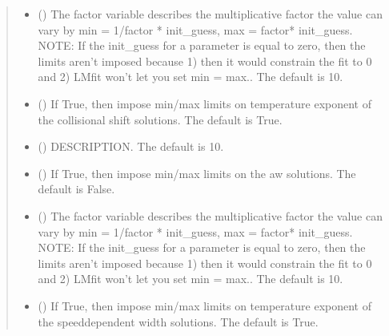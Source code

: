 \documentclass[letterpaper,10pt,english]{sphinxmanual}
\begin{document}
\begin{fulllineitems}
\begin{quote}
\begin{description}
\begin{itemize}
\item {} 
\sphinxAtStartPar
{} (\sphinxstyleliteralemphasis{\sphinxupquote{, }}) \textendash{} The factor variable describes the multiplicative factor the value can vary by min = 1/factor * init\_guess, max = factor* init\_guess. NOTE: If the init\_guess for a parameter is equal to zero, then the limits aren’t imposed because 1) then it would constrain the fit to 0 and 2) LMfit won’t let you set min = max.. The default is 10.

\item {} 
\sphinxAtStartPar
{} (\sphinxstyleliteralemphasis{\sphinxupquote{, }}) \textendash{} If True, then impose min/max limits on temperature exponent of the collisional shift solutions. The default is True.

\item {} 
\sphinxAtStartPar
{} (\sphinxstyleliteralemphasis{\sphinxupquote{, }}) \textendash{} DESCRIPTION. The default is 10.

\item {} 
\sphinxAtStartPar
{} (\sphinxstyleliteralemphasis{\sphinxupquote{, }}) \textendash{} If True, then impose min/max limits on the aw solutions. The default is False.

\item {} 
\sphinxAtStartPar
{} (\sphinxstyleliteralemphasis{\sphinxupquote{, }}) \textendash{} The factor variable describes the multiplicative factor the value can vary by min = 1/factor * init\_guess, max = factor* init\_guess. NOTE: If the init\_guess for a parameter is equal to zero, then the limits aren’t imposed because 1) then it would constrain the fit to 0 and 2) LMfit won’t let you set min = max.. The default is 10.

\item {} 
\sphinxAtStartPar
{} (\sphinxstyleliteralemphasis{\sphinxupquote{, }}) \textendash{} If True, then impose min/max limits on temperature exponent of the speed\sphinxhyphen{}dependent width solutions. The default is True.


\end{itemize}
\end{description}
\end{quote}
\end{fulllineitems}
\end{document}
